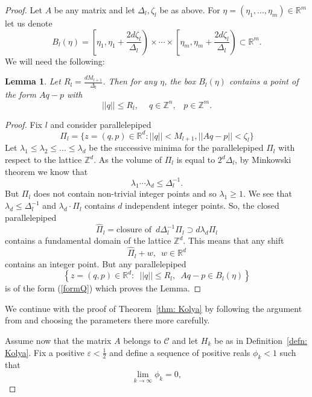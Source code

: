 \documentclass[reqno,11pt, twoside]{amsart}
\theoremstyle{plain}
\newtheorem{lem}[thm]{Lemma}
\theoremstyle{definition}
\theoremstyle{definition}
\theoremstyle{remark}
\numberwithin{equation}{section}
\newcommand{\Del}{\Delta}
\newcommand{\cC}{\mathcal{C}}
\newcommand\wh[1]{\widehat{#1}}
\begin{document}
\begin{proof}
Let $A$ be any matrix and let $\Del_l, \zeta_l$ be as above.   
 For ${\eta} = (\eta_1,...,\eta_m) \in \mathbb{R}^m$ let us denote
\begin{equation}\label{box}
B_{l}({\eta})=
\left[\eta_1, \eta_1 + \frac{2d\zeta_l}{\Delta_l}\right)\times \cdots\times   \left[\eta_m, \eta_m + \frac{2d\zeta_l}{\Delta_l}\right) 
\subset \mathbb{R}^m
.
\end{equation}
We will need the following:
\begin{lem}\label{lem: Kolya}  
Let $R_l = \frac{dM_{l+1}}{\Delta_l} $. Then  for any $\eta$, the box $B_{l}({\eta})$ contains a point of the form $ Aq-p$ with 
\begin{equation}\label{qp}
 ||q|| \le  R_l 
,\,\,\,\,\,\,\
q\in \mathbb{Z}^n
,\,\,\,\,\, p \in \mathbb{Z}^m.
\end{equation}
\end{lem}
\begin{proof} 
 Fix $l$ 
 and consider parallelepiped 
$$
 \Pi_l =
 \{ z = (q,p) \in \mathbb{R}^d: ||q|| < M_{l+1}, ||Aq-p||< \zeta_l\}
 $$
Let  $\lambda_1\le \lambda_2\le ...\le \lambda_d$ be the successive minima  for the parallelepiped $\Pi_l$ with respect to the lattice $
 \mathbb{Z}^{d}$. As the volume of $\Pi_l $ is equal to $2^{d}\Delta_l$, by Minkowski theorem we know that 
 $$
 \lambda_1 \cdots \lambda_{d} \le \Delta_l^{-1}.
 $$
 But $\Pi_l$ does not contain non-trivial integer points and so $ \lambda_1 \ge 1$. We see that 
 $\lambda_{d}\le  \Delta_l^{-1}$ and
 $\lambda_{d} \cdot \Pi_l$
 contains $d$ independent integer points. So, the closed parallelepiped
 $$
 \wh{\Pi}_l = \text{closure of } \,d\Delta_l^{-1} {\Pi_l} \supset  d \lambda_{d} \Pi_l
 $$
 contains a fundamental domain of the lattice $\mathbb{Z}^{d}$. This means that any shift 
 \begin{equation}\label{formQ}
  \wh{\Pi}_l+w, \,\,\, w\in \mathbb{R}^{d}
  \end{equation} contains an integer point. But any parallelepiped
 $$
 \left\{ z = (q,p)\in \mathbb{R}^{d}:\,\,\,
 ||q|| \le R_l,\,\,\, Aq-p \in B_{l}({\eta})
\right\}
 $$
 is of the form (\ref{formQ}) which proves the Lemma.
 \end{proof}
 
 We continue with the proof of Theorem~\ref{thm: Kolya} by following the argument from \cite{Mosh-welldistributed} and choosing the parameters there more carefully.

 Assume now that the matrix $A$ belongs to $\cC$ and let $H_k$ be as in
 Definition~\ref{defn: Kolya}.
 Fix a positive $\varepsilon <\frac{1}{2}$ and define 
  a sequence  of  positive reals $
 \phi_k< 1
 $
 such that 
 \begin{equation}\label{ff1}
 \lim_{k \to \infty} \phi_k  =0,
  \end{equation}
 

\end{proof}
\end{document}
